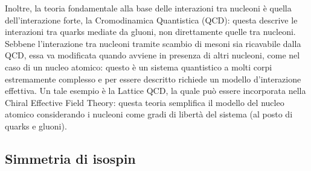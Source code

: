 Inoltre, la teoria fondamentale alla base delle interazioni tra nucleoni è quella dell'interazione forte, la Cromodinamica Quantistica (QCD): questa descrive le interazioni tra quarks mediate da gluoni, non direttamente quelle tra nucleoni. Sebbene l'interazione tra nucleoni tramite scambio di mesoni sia ricavabile dalla QCD, essa va modificata quando avviene in presenza di altri nucleoni, come nel caso di un nucleo atomico: questo è un sistema quantistico a molti corpi estremamente complesso e per essere descritto richiede un modello d'interazione effettiva. Un tale esempio è la Lattice QCD, la quale può essere incorporata nella Chiral Effective Field Theory: questa teoria semplifica il modello del nucleo atomico considerando i nucleoni come gradi di libertà del sistema (al posto di quarks e gluoni).

\subsection{Simmetria di isospin}


